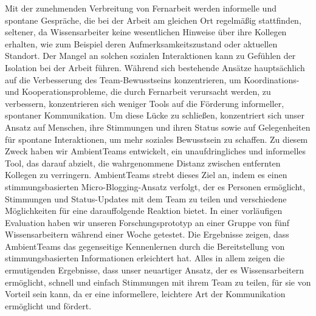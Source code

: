 \documentclass{seal_thesis}
\begin{document}
\begin{zusammenfassung}
    Mit der zunehmenden Verbreitung von Fernarbeit werden informelle und spontane Gespräche, die bei der Arbeit am gleichen Ort regelmäßig stattfinden, seltener, da Wissensarbeiter keine wesentlichen Hinweise über ihre Kollegen erhalten, wie zum Beispiel deren Aufmerksamkeitszustand oder aktuellen Standort. Der Mangel an solchen sozialen Interaktionen kann zu Gefühlen der Isolation bei der Arbeit führen. Während sich bestehende Ansätze hauptsächlich auf die Verbesserung des Team-Bewusstseins konzentrieren, um Koordinations- und Kooperationsprobleme, die durch Fernarbeit verursacht werden, zu verbessern, konzentrieren sich weniger Tools auf die Förderung informeller, spontaner Kommunikation. Um diese Lücke zu schließen, konzentriert sich unser Ansatz auf Menschen, ihre Stimmungen und ihren Status sowie auf Gelegenheiten für spontane Interaktionen, um mehr soziales Bewusstsein zu schaffen. Zu diesem Zweck haben wir AmbientTeams entwickelt, ein unaufdringliches und informelles Tool, das darauf abzielt, die wahrgenommene Distanz zwischen entfernten Kollegen zu verringern. AmbientTeams strebt dieses Ziel an, indem es einen stimmungsbasierten Micro-Blogging-Ansatz verfolgt, der es Personen ermöglicht, Stimmungen und Status-Updates mit dem Team zu teilen und verschiedene Möglichkeiten für eine darauffolgende Reaktion bietet. In einer vorläufigen Evaluation haben wir unseren Forschungsprototyp an einer Gruppe von fünf Wissensarbeitern während einer Woche getestet. Die Ergebnisse zeigen, dass AmbientTeams das gegenseitige Kennenlernen durch die Bereitstellung von stimmungsbasierten Informationen erleichtert hat. Alles in allem zeigen die ermutigenden Ergebnisse, dass unser neuartiger Ansatz, der es Wissensarbeitern ermöglicht, schnell und einfach Stimmungen mit ihrem Team zu teilen, für sie von Vorteil sein kann, da er eine informellere, leichtere Art der Kommunikation ermöglicht und fördert.
\end{zusammenfassung}

\setcounter{tocdepth}{1}
\tableofcontents
\listoffigures
\listoftables

\mainmatter









\begin{appendices}
    
\end{appendices}

\backmatter
\printbibliography
\end{document}
